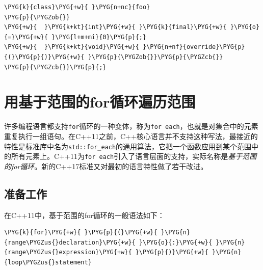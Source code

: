 
\begin{codeblockbg}
\begin{Verbatim}[commandchars=\\\{\},breaklines=true,breakanywhere=true,fontsize=\codefont,xleftmargin=17bp]
\PYG{k}{class}\PYG{+w}{ }\PYG{n+nc}{foo}
\PYG{p}{\PYGZob{}}
\PYG{+w}{  }\PYG{k+kt}{int}\PYG{+w}{ }\PYG{k}{final}\PYG{+w}{ }\PYG{o}{=}\PYG{+w}{ }\PYG{l+m+mi}{0}\PYG{p}{;}
\PYG{+w}{  }\PYG{k+kt}{void}\PYG{+w}{ }\PYG{n+nf}{override}\PYG{p}{(}\PYG{p}{)}\PYG{+w}{ }\PYG{p}{\PYGZob{}}\PYG{p}{\PYGZcb{}}
\PYG{p}{\PYGZcb{}}\PYG{p}{;}
\end{Verbatim}
\end{codeblockbg}



\section{用基于范围的for循环遍历范围}



许多编程语言都支持\texttt{for}循环的一种变体，称为\texttt{for each}，也就是对集合中的元素重复执行一组语句。在C++11之前，C++核心语言并不支持这种写法，最接近的特性是标准库中名为\texttt{std::\allowbreak{}for\_\allowbreak{}each}的通用算法，它把一个函数应用到某个范围中的所有元素上。C++11为\texttt{for each}引入了语言层面的支持，实际名称是\textit{基于范围的for循环}。新的C++17标准又对最初的语言特性做了若干改进。



\subsection{准备工作}



在C++11中，基于范围的for循环的一般语法如下：



\begin{codeblockbg}
\begin{Verbatim}[commandchars=\\\{\},breaklines=true,breakanywhere=true,fontsize=\codefont,xleftmargin=17bp]
\PYG{k}{for}\PYG{+w}{ }\PYG{p}{(}\PYG{+w}{ }\PYG{n}{range\PYGZus{}declaration}\PYG{+w}{ }\PYG{o}{:}\PYG{+w}{ }\PYG{n}{range\PYGZus{}expression}\PYG{+w}{ }\PYG{p}{)}\PYG{+w}{ }\PYG{n}{loop\PYGZus{}statement}
\end{Verbatim}
\end{codeblockbg}


